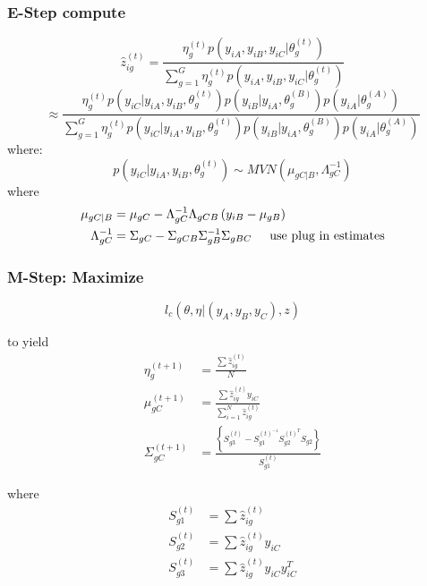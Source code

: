 \documentclass[a4paper,12pt]{article}\usepackage[]{graphicx}\usepackage[]{color}
\begin{document}
\subsubsection*{E-Step compute}
\[
\hat{z}_{ig}^{\left(t \right)} = \frac{ \eta_{g}^{\left(t \right)}p \left(y_{iA}, y_{iB}, y_{iC}| \theta_{g}^{\left(t \right)} \right)}{\sum_{g=1}^{G} \eta_{g}^{\left(t \right)} p \left(y_{iA},y_{iB},y_{iC} | \theta_{g}^{\left(t \right)} \right)}
\]
\[
\approx \frac{\eta_{g}^{\left(t \right)}p \left(y_{iC}|y_{iA}, y_{iB},\theta_{g}^{\left(t \right)}\right)p\left(y_{iB}|y_{iA},\theta_{g}^{\left(B \right)} \right)p \left(y_{iA}|\theta_{g}^{\left(A \right)} \right)}{\sum_{g=1}^{G} \eta_{g}^{\left(t \right)}p \left(y_{iC}|y_{iA}, y_{iB},\theta_{g}^{\left(t \right)}\right)p\left(y_{iB}|y_{iA},\theta_{g}^{\left(B \right)} \right)p \left(y_{iA}|\theta_{g}^{\left(A \right)} \right)}
\]
where:
\[
p \left(y_{iC}|y_{iA}, y_{iB},\theta_{g}^{\left(t \right)}\right) \sim MVN \left(\mu_{gC|B}, \Lambda_{gC}^{-1} \right)
\]
where
\begin{align*}
\mu_{gC|B} &= \mu_{gC} - \Lambda_{gC}^{-1} \Lambda_{gCB} \left(y_{iB}-\mu_{gB} \right)\\
\Lambda_{gC}^{-1} &= \Sigma_{gC} - \Sigma_{gCB}\Sigma_{gB}^{-1}\Sigma_{gBC} \hspace{5mm} \text{use plug in estimates}
\end{align*}
\noindent{}
\subsubsection*{M-Step: Maximize}

\[
l_{c} \left(\theta, \eta | \left(y_{A}, y_{B}, y_{C} \right), z \right)
\]

to yield
\begin{align*}
\eta_g^{\left(t+1\right)} &= \frac{\sum \hat{z}_{ig}^{\left(t \right)}}{N}\\
\mu_{gC}^{\left(t+1 \right)} &= \frac{\sum \hat{z}_{ig}^{\left(t \right)}y_{iC}}{\sum_{i=1}^{N}\hat{z}_{ig}^{\left(t \right)}}\\
\Sigma_{gC}^{\left(t+1\right)} &= \frac{\left\{S_{g3}^{\left(t\right)} - S_{g1}^{\left(t \right)^{-1}} S_{g2}^{\left(t \right)^{T}} S_{g2}\right\}}{S_{g1}^{\left(t \right)}}
\end{align*}


where
\begin{align*}
S_{g1}^{\left(t \right)} &= \sum \hat{z}_{ig}^{\left(t \right)}\\
S_{g2}^{\left(t \right)} &= \sum \hat{z}_{ig}^{\left(t \right)} y_{iC}\\
S_{g3}^{\left(t \right)} &= \sum \hat{z}_{ig}^{\left(t \right)} y_{iC} y_{iC}^{T}
\end{align*}
\end{document}
